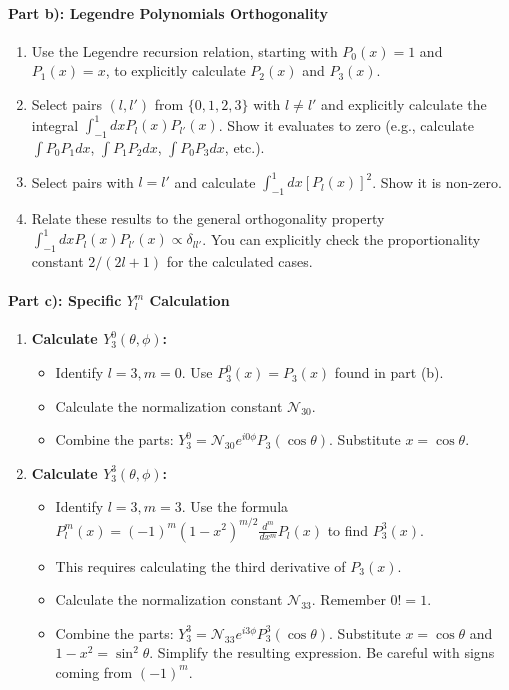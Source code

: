 \documentclass[10pt]{article}
\begin{document}
\paragraph{Part b): Legendre Polynomials Orthogonality}
\begin{enumerate}
    \item Use the Legendre recursion relation, starting with \(P_0(x)=1\) and \(P_1(x)=x\), to explicitly calculate \(P_2(x)\) and \(P_3(x)\).
    \item Select pairs \((l, l')\) from \(\{0, 1, 2, 3\}\) with \(l \neq l'\) and explicitly calculate the integral \(\int_{-1}^{1} dx P_l(x) P_{l'}(x)\). Show it evaluates to zero (e.g., calculate \(\int P_0 P_1 dx\), \(\int P_1 P_2 dx\), \(\int P_0 P_3 dx\), etc.).
    \item Select pairs with \(l = l'\) and calculate \(\int_{-1}^{1} dx [P_l(x)]^2\). Show it is non-zero.
    \item Relate these results to the general orthogonality property \(\int_{-1}^{1} dx P_l(x) P_{l'}(x) \propto \delta_{ll'}\). You can explicitly check the proportionality constant \(2/(2l+1)\) for the calculated cases.
\end{enumerate}

\paragraph{Part c): Specific \(Y_l^m\) Calculation}
\begin{enumerate}
    \item \textbf{Calculate \(Y_3^0(\theta, \phi)\):}
        \begin{itemize}
            \item Identify \(l=3, m=0\). Use \(P_3^0(x) = P_3(x)\) found in part (b).
            \item Calculate the normalization constant \(\mathcal{N}_{30}\).
            \item Combine the parts: \(Y_3^0 = \mathcal{N}_{30} e^{i0\phi} P_3(\cos\theta)\). Substitute \(x = \cos\theta\).
        \end{itemize}
    \item \textbf{Calculate \(Y_3^3(\theta, \phi)\):}
        \begin{itemize}
            \item Identify \(l=3, m=3\). Use the formula \(P_{l}^{m}(x)=(-1)^{m}\left(1-x^{2}\right)^{m / 2} \frac{d^{m}}{d x^{m}} P_{l}(x)\) to find \(P_3^3(x)\).
            \item This requires calculating the third derivative of \(P_3(x)\).
            \item Calculate the normalization constant \(\mathcal{N}_{33}\). Remember \(0!=1\).
            \item Combine the parts: \(Y_3^3 = \mathcal{N}_{33} e^{i3\phi} P_3^3(\cos\theta)\). Substitute \(x=\cos\theta\) and \(1-x^2 = \sin^2\theta\). Simplify the resulting expression. Be careful with signs coming from \( (-1)^m \).
        \end{itemize}
\end{enumerate}
\end{document}
